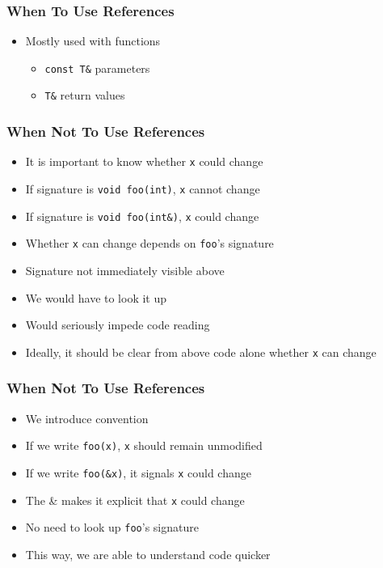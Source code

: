 \begin{frame}
  \frametitle{When To Use References}
  \begin{itemize}
    \item Mostly used with functions
          \begin{itemize}
            \item \texttt{const T\&} parameters
            \item \texttt{T\&} return values
          \end{itemize}
  \end{itemize}
\end{frame}

\begin{frame}
  \frametitle{When Not To Use References}
  \begin{itemize}
    \item It is important to know whether \texttt{x} could change
    \item If signature is \texttt{void foo(int)}, \texttt{x} cannot change
    \item If signature is \texttt{void foo(int\&)}, \texttt{x} could change
    \item Whether \texttt{x} can change depends on \texttt{foo}'s signature
    \item Signature not immediately visible above
    \item We would have to look it up
    \item Would seriously impede code reading
    \item Ideally, it should be clear from above code alone whether \texttt{x} can change
  \end{itemize}
\end{frame}

\begin{frame}
  \frametitle{When Not To Use References}
  \begin{itemize}
    \item We introduce convention
    \item If we write \texttt{foo(x)}, \texttt{x} should remain unmodified
    \item If we write \texttt{foo(\&x)}, it signals \texttt{x} could change
    \item The \& makes it explicit that \texttt{x} could change
    \item No need to look up \texttt{foo}'s signature
    \item This way, we are able to understand code quicker
  \end{itemize}
\end{frame}

